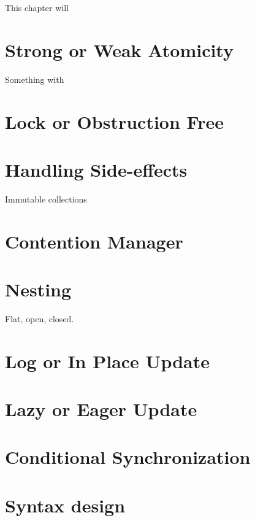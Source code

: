 \makeatletter {}\makeatother
{}
This chapter will
\label{chap:stm_design}
\section{Strong or Weak Atomicity}
Something with\cite[p. 1]{harris2003language}
\section{Lock or Obstruction Free}
\section{Handling Side-effects}
Immutable collections
\section{Contention Manager}
\section{Nesting}
Flat, open, closed.
\section{Log or In Place Update}
\section{Lazy or Eager Update}
\section{Conditional Synchronization}
\section{Syntax design}

%
%
%
%    
%
%    
         

\worksheetend